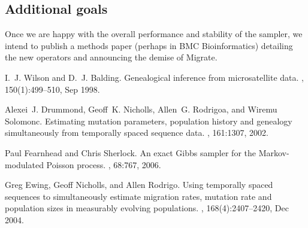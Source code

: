 \documentclass[a4paper,11pt]{article}
\begin{document}
\subsection{Additional goals}

Once we are happy with the overall performance and stability of the
sampler, we intend to publish a methods paper (perhaps in BMC
Bioinformatics) detailing the new operators and announcing the demise
of Migrate.

%
%

\begin{thebibliography}{1}

I.~J. Wilson and D.~J. Balding.
\newblock Genealogical inference from microsatellite data.
, 150(1):499--510, Sep 1998.

Alexei~J. Drummond, Geoff~K. Nicholls, Allen~G. Rodrigoa, and Wiremu Solomonc.
\newblock Estimating mutation parameters, population history and genealogy
  simultaneously from temporally spaced sequence data.
, 161:1307, 2002.

Paul Fearnhead and Chris Sherlock.
\newblock An exact Gibbs sampler for the Markov-modulated Poisson process.
, 68:767,
  2006.

Greg Ewing, Geoff Nicholls, and Allen Rodrigo.
\newblock Using temporally spaced sequences to simultaneously estimate
  migration rates, mutation rate and population sizes in measurably evolving
  populations.
, 168(4):2407--2420, Dec 2004.

\end{thebibliography}
\end{document}
